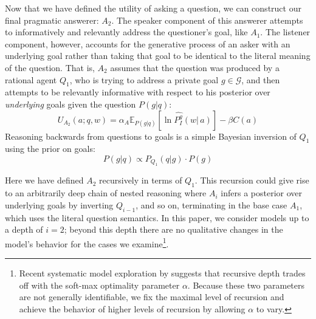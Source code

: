 \documentclass[11pt, floatsintext]{apa6}
\newcommand{\E}[2]{\ensuremath{\mathbb{E}_{#1}\left [#2 \right]}}
\begin{document}
Now that we have defined the utility of asking a question, we can construct our final pragmatic answerer: $A_2$. The speaker component of this answerer attempts to informatively and relevantly address the questioner's goal, like $A_1$. The listener component, however, accounts for the generative process of an asker with an underlying goal rather than taking that goal to be identical to the literal meaning of the question. That is, $A_2$ assumes that the question was produced by a rational agent $Q_1$, who is trying to address a private goal $g \in \mathcal{G}$, and then attempts to be relevantly informative with respect to his posterior over \emph{underlying} goals given the question $P(g|q)$:
\begin{equation}
U_{A_2}(a; q, w) = \alpha_A \E{P(g|q)}{\ln \widehat{P^g_I}(w|\,a) }- \beta C(a)
\end{equation}
%
Reasoning backwards from questions to goals is a simple Bayesian inversion of $Q_1$ using the prior on goals:
$$
P(g|q) \propto P_{Q_1}(q|g)\cdot P(g)
$$

Here we have defined $A_2$ recursively in terms of $Q_1$. This recursion could give rise to an arbitrarily deep chain of nested reasoning where $A_{i}$ infers a posterior over underlying goals by inverting $Q_{i-1}$, and so on, terminating in the base case $A_1$, which uses the literal question semantics. In this paper, we consider models up to a depth of $i=2$; beyond this depth there are no qualitative changes in the model's behavior for the cases we examine\footnote{Recent systematic model exploration by  suggests that recursive depth trades off with the soft-max optimality parameter $\alpha$. Because these two parameters are not generally identifiable, we fix the maximal level of recursion and achieve the behavior of higher levels of recursion by allowing $\alpha$ to vary.}. 
\end{document}
